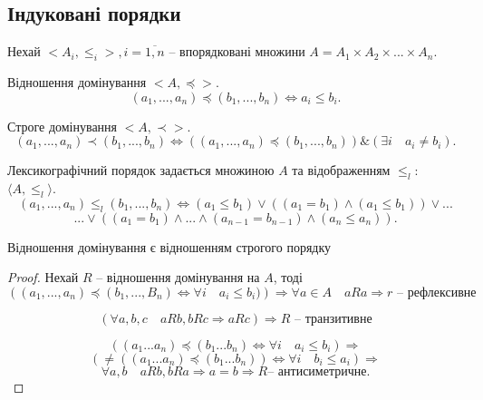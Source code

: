\subsection{Індуковані порядки}

Нехай $<A_i, \leqslant_{i}>, i = \overline{1, n}$ -- впорядковані множини
$A = A_1 \times A_2 \times ... \times A_n$.

\begin{definition}
    Відношення домінування $<A, \preccurlyeq>$.
    $$(a_1, ..., a_n) \preccurlyeq (b_1, ..., b_n) \Leftrightarrow a_i \leqslant b_i.$$
\end{definition}

\begin{definition}
    Строге домінування $<A, \prec>$.
    $$(a_1, ..., a_n) \prec (b_1, ..., b_n) \Leftrightarrow
    ((a_1, ..., a_n) \preccurlyeq (b_1, ..., b_n)) \& (\exists i \quad a_i \neq b_i).$$
\end{definition}

\begin{definition}
    Лексикографічний порядок задається множиною $A$ та відображенням $\leqslant_{l}$: $\langle A, \leqslant_{l} \rangle$.
    $$(a_1, ..., a_n) \leqslant_{l} (b_1, ..., b_n)
    \Leftrightarrow
        (a_1 \leqslant b_1)
        \vee ((a_1 = b_1) \wedge (a_1 \leqslant b_1))
        \vee ...$$
    $$...\vee ((a_1 = b_1) \wedge ... \wedge (a_{n-1} = b_{n-1}) \wedge (a_n \leqslant a_n)).$$
\end{definition}


\begin{claim}
    Відношення домінування є відношенням строгого порядку
\end{claim}
\begin{proof}    
    Нехай $R$ -- відношення домінування на $A$, тоді
    $$\left((a_1, ..., a_n) \preccurlyeq (b_1, ..., B_n) \Leftrightarrow \forall i \quad a_i \leqslant b_i)\right)
    \Rightarrow \forall a \in A \quad aRa \Rightarrow r \text{ -- рефлексивне}$$
    
    $$(\forall a, b, c \quad aRb, bRc \Rightarrow aRc) \Rightarrow R \text{ -- транзитивне}$$
    
    $$((a_1 ... a_n) \preccurlyeq (b_1 ... b_n) \Leftrightarrow \forall i \quad a_i \leqslant b_i) \Rightarrow$$
    $$(\neq((a_1 ... a_n) \preccurlyeq (b_1 ... b_n)) \Leftrightarrow \forall i \quad b_i \leqslant a_i) \Rightarrow$$
    $$\forall a, b \quad aRb, bRa \Rightarrow a = b \Rightarrow R \text{-- антисиметричне}.$$
\end{proof}

